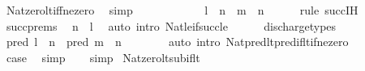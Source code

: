 \begin{isabellebody}
\ Nat{\isacharunderscore}{\kern0pt}zero{\isacharunderscore}{\kern0pt}lt{\isacharunderscore}{\kern0pt}iff{\isacharunderscore}{\kern0pt}ne{\isacharunderscore}{\kern0pt}zero\ \isamarkupfalse%
\ simp\isanewline
\ \ \ \ \isamarkupfalse%
\isanewline
\ \ \ \ \isamarkupfalse%
\ \isamarkupfalse%
\ {\isachardoublequoteopen}l\ {\isacharminus}{\kern0pt}\ n\ {\isacharless}{\kern0pt}\ m\ {\isacharminus}{\kern0pt}\ n{\isachardoublequoteclose}\isanewline
\ \ \ \ \isamarkupfalse%
\ {\isacharparenleft}{\kern0pt}rule\ succ{\isachardot}{\kern0pt}IH{\isacharparenright}{\kern0pt}\isanewline
\ \ \ \ \ \ \isamarkupfalse%
\ succ{\isachardot}{\kern0pt}prems\ \isamarkupfalse%
\ {\isachardoublequoteopen}n\ {\isasymle}\ l{\isachardoublequoteclose}\ \isamarkupfalse%
\ {\isacharparenleft}{\kern0pt}auto\ intro{\isacharcolon}{\kern0pt}\ Nat{\isacharunderscore}{\kern0pt}le{\isacharunderscore}{\kern0pt}if{\isacharunderscore}{\kern0pt}succ{\isacharunderscore}{\kern0pt}le{\isacharparenright}{\kern0pt}\isanewline
\ \ \ \ \isamarkupfalse%
\ discharge{\isacharunderscore}{\kern0pt}types\isanewline
\ \ \ \ \isamarkupfalse%
\ \isamarkupfalse%
\ {\isachardoublequoteopen}pred\ {\isacharparenleft}{\kern0pt}l\ {\isacharminus}{\kern0pt}\ n{\isacharparenright}{\kern0pt}\ {\isacharless}{\kern0pt}\ pred\ {\isacharparenleft}{\kern0pt}m\ {\isacharminus}{\kern0pt}\ n{\isacharparenright}{\kern0pt}{\isachardoublequoteclose}\isanewline
\ \ \ \ \ \ \isamarkupfalse%
\ {\isacharparenleft}{\kern0pt}auto\ intro{\isacharbang}{\kern0pt}{\isacharcolon}{\kern0pt}\ Nat{\isacharunderscore}{\kern0pt}pred{\isacharunderscore}{\kern0pt}lt{\isacharunderscore}{\kern0pt}pred{\isacharunderscore}{\kern0pt}if{\isacharunderscore}{\kern0pt}lt{\isacharunderscore}{\kern0pt}if{\isacharunderscore}{\kern0pt}ne{\isacharunderscore}{\kern0pt}zero{\isacharparenright}{\kern0pt}\isanewline
\ \ \ \ \isamarkupfalse%
\ \isamarkupfalse%
\ {\isacharquery}{\kern0pt}case\ \isamarkupfalse%
\ simp\isanewline
\ \ \isamarkupfalse%
\ simp\isanewline
{}\isamarkupfalse%
%
\endisatagproof
{\isafoldproof}%
%
\isadelimproof
\isanewline
%
\endisadelimproof
\isanewline
{}\isamarkupfalse%
\ Nat{\isacharunderscore}{\kern0pt}zero{\isacharunderscore}{\kern0pt}lt{\isacharunderscore}{\kern0pt}sub{\isacharunderscore}{\kern0pt}if{\isacharunderscore}{\kern0pt}lt{\isacharcolon}{\kern0pt}\isanewline

\end{isabellebody}
